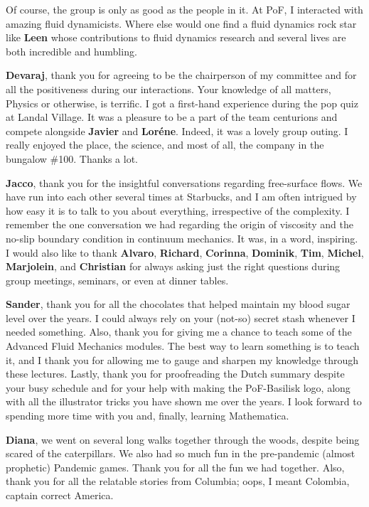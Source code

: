 Of course, the group is only as good as the people in it. At PoF, I interacted with amazing fluid dynamicists. Where else would one find a fluid dynamics rock star like {\bf Leen} whose contributions to fluid dynamics research and several lives are both incredible and humbling. 

{\bf Devaraj}, thank you for agreeing to be the chairperson of my committee and for all the positiveness during our interactions. Your knowledge of all matters, Physics or otherwise, is terrific. I got a first-hand experience during the pop quiz at Landal Village. It was a pleasure to be a part of the team centurions and compete alongside {\bf Javier} and {\bf Lor{\'e}ne}. Indeed, it was a lovely group outing. I really enjoyed the place, the science, and most of all, the company in the bungalow \#100. Thanks a lot. 

{\bf Jacco}, thank you for the insightful conversations regarding free-surface flows. We have run into each other several times at Starbucks, and I am often intrigued by how easy it is to talk to you about everything, irrespective of the complexity. I remember the one conversation we had regarding the origin of viscosity and the no-slip boundary condition in continuum mechanics. It was, in a word, inspiring. I would also like to thank {\bf Alvaro}, {\bf Richard}, {\bf Corinna}, {\bf Dominik}, {\bf Tim}, {\bf Michel}, {\bf Marjolein}, and {\bf Christian} for always asking just the right questions during group meetings, seminars, or even at dinner tables. 

{\bf Sander}, thank you for all the chocolates that helped maintain my blood sugar level over the years. I could always rely on your (not-so) secret stash whenever I needed something. Also, thank you for giving me a chance to teach some of the Advanced Fluid Mechanics modules. The best way to learn something is to teach it, and I thank you for allowing me to gauge and sharpen my knowledge through these lectures. Lastly, thank you for proofreading the Dutch summary despite your busy schedule and for your help with making the PoF-Basilisk logo, along with all the illustrator tricks you have shown me over the years. I look forward to spending more time with you and, finally, learning Mathematica. 

{\bf Diana}, we went on several long walks together through the woods, despite being scared of the caterpillars. We also had so much fun in the pre-pandemic (almost prophetic) Pandemic games. Thank you for all the fun we had together. Also, thank you for all the relatable stories from Columbia; oops, I meant Colombia, captain correct America. 


